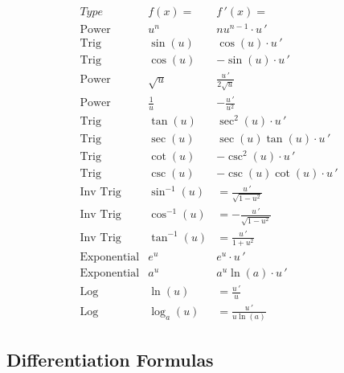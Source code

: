 \documentclass[handout]{ximera}
\begin{document}
\begin{center}
\[
\begin{array}{c|c|c}
		Type & f(x)= & f\,'(x)=  \\
		\hline
		\text{Power} & u^n & nu^{n-1}\cdot u\,'  \\[8pt]
		\hline
		\text{Trig} & \sin\left(u\right) & \cos\left(u\right) \cdot u\,' \\[8pt]
		\text{Trig} & \cos\left(u\right) & -\sin\left(u\right)\cdot u\,'  \\[8pt]
		\hline
		\text{Power} & \sqrt{u} & \displaystyle \frac{u\,' }{2\sqrt {u}}\\[8pt]
		\text{Power} & \displaystyle \frac{1}{u} & -\displaystyle \frac{u\,' }{u^2}\\[8pt]
	  \hline
	  \text{Trig} & \tan\left(u\right) & \sec^2\left(u\right) \cdot u\,'  \\[8pt]
		\text{Trig} & \sec\left(u\right) & \sec\left(u\right)\tan\left(u\right) \cdot u\,'  \\[8pt]
		\hline
		\text{Trig} & \cot\left(u\right) & -\csc^2\left(u\right) \cdot u\,'   \\[8pt]
		\text{Trig} & \csc\left(u\right) & -\csc\left(u\right)\cot\left(u\right) \cdot u\,'   \\[8pt]
		\hline
		\text{Inv Trig} & \sin^{-1}\left(u\right) &  = \displaystyle \frac{u\,' }{\sqrt{1-u^2}}  \\[8pt]
		\text{Inv Trig} & \cos^{-1}\left(u\right) &  = \displaystyle -\frac{u\,' }{\sqrt{1-u^2}}\\[8pt]
		\text{Inv Trig} & \tan^{-1}\left(u\right) &  = \displaystyle \frac{u\,' }{1+u^2} \\[8pt]
		\hline
		\text{Exponential} & e^{u} & e^{u} \cdot u\,' \\[8pt]
		\text{Exponential} & a^{u} & a^{u}\ln(a) \cdot u\,' \\[8pt]
		\hline
		\text{Log} & \ln\left(u\right) &  = \displaystyle \frac{u\,'}{u} \\[8pt]
		\text{Log} & \log_a\left(u\right) &  = \displaystyle \frac{u\,'}{u\ln(a)}
	\end{array}
    \]
\end{center}



\subsection{Differentiation Formulas}
\end{document}
